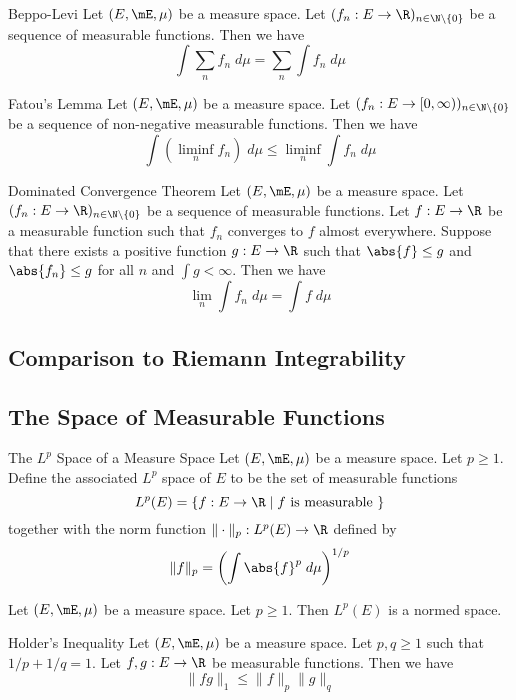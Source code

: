 \documentclass[a4paper]{article}
\begin{document}
\begin{prp}{Beppo-Levi}{} Let $(E,\mE,\mu)$ be a measure space. Let $(f_n:E\to\R)_{n\in\N\setminus\{0\}}$ be a sequence of measurable functions. Then we have $$\int\sum_nf_n\;d\mu=\sum_n\int f_n\;d\mu$$
\end{prp}

\begin{thm}{Fatou's Lemma}{} Let $(E,\mE,\mu)$ be a measure space. Let $(f_n:E\to[0,\infty))_{n\in\N\setminus\{0\}}$ be a sequence of non-negative measurable functions. Then we have $$\int\left(\liminf_nf_n\right)\;d\mu\leq\liminf_n\int f_n\;d\mu$$
\end{thm}

\begin{thm}{Dominated Convergence Theorem}{} Let $(E,\mE,\mu)$ be a measure space. Let $(f_n:E\to\R)_{n\in\N\setminus\{0\}}$ be a sequence of measurable functions. Let $f:E\to\R$ be a measurable function such that $f_n$ converges to $f$ almost everywhere. Suppose that there exists a positive function $g:E\to\R$ such that $\abs{f}\leq g$ and $\abs{f_n}\leq g$ for all $n$ and $\int g<\infty$. Then we have $$\lim_n\int f_n\;d\mu=\int f\;d\mu$$
\end{thm}

\subsection{Comparison to Riemann Integrability}

\subsection{The Space of Measurable Functions}
\begin{defn}{The $L^p$ Space of a Measure Space}{} Let $(E,\mE,\mu)$ be a measure space. Let $p\geq 1$. Define the associated $L^p$ space of $E$ to be the set of measurable functions $$L^p(E)=\{f:E\to\R\;|\;f\text{ is measurable }\}$$ together with the norm function $\|\cdot\|_p:L^p(E)\to\R$ defined by $$\|f\|_p=\left(\int\abs{f}^p\;d\mu\right)^{1/p}$$
\end{defn}

\begin{lmm}{}{} Let $(E,\mE,\mu)$ be a measure space. Let $p\geq 1$. Then $L^p(E)$ is a normed space. 
\end{lmm}

\begin{prp}{Holder's Inequality}{} Let $(E,\mE,\mu)$ be a measure space. Let $p,q\geq 1$ such that $1/p+1/q=1$. Let $f,g:E\to\R$ be measurable functions. Then we have $$\|fg\|_1\leq\|f\|_p\|g\|_q$$
\end{prp}
\end{document}

